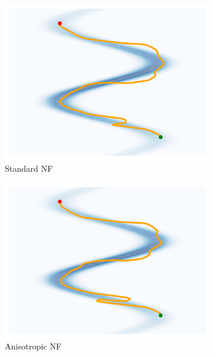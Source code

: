 \begin{figure}[htbp]
\begin{subfigure}[b]{0.18\textwidth}
            \includegraphics[width=\textwidth]{chapter5/results/visualisations/geodesics/standard_normal.png}
            \caption{Standard NF}
        \end{subfigure}
        \begin{subfigure}[b]{0.18\textwidth}
            \includegraphics[width=\textwidth]{chapter5/results/visualisations/geodesics/standard_normal_anisotropic.png}
            \caption{Anisotropic NF}
        \end{subfigure}
        \begin{subfigure}[b]{0.18\textwidth}

\end{subfigure}
\end{figure}
